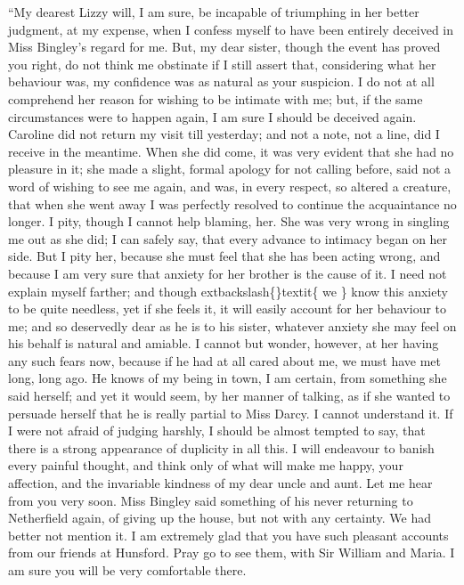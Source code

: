 \documentclass[10pt]{book}
\begin{document}
    “My dearest Lizzy will, I am sure, be incapable of triumphing in
her better judgment, at my expense, when I confess myself to have
been entirely deceived in Miss Bingley’s regard for me. But, my
dear sister, though the event has proved you right, do not think me
obstinate if I still assert that, considering what her behaviour
was, my confidence was as natural as your suspicion. I do not at
all comprehend her reason for wishing to be intimate with me; but,
if the same circumstances were to happen again, I am sure I should
be deceived again. Caroline did not return my visit till yesterday;
and not a note, not a line, did I receive in the meantime. When she
did come, it was very evident that she had no pleasure in it; she
made a slight, formal apology for not calling before, said not a
word of wishing to see me again, and was, in every respect, so
altered a creature, that when she went away I was perfectly
resolved to continue the acquaintance no longer. I pity, though I
cannot help blaming, her. She was very wrong in singling me out as
she did; I can safely say, that every advance to intimacy began on
her side. But I pity her, because she must feel that she has been
acting wrong, and because I am very sure that anxiety for her
brother is the cause of it. I need not explain myself farther; and
though
    	extbackslash\{\}textit\{
     we
    \}
    know this anxiety to be quite needless, yet if she
feels it, it will easily account for her behaviour to me; and so
deservedly dear as he is to his sister, whatever anxiety she may
feel on his behalf is natural and amiable. I cannot but wonder,
however, at her having any such fears now, because if he had at all
cared about me, we must have met long, long ago. He knows of my
being in town, I am certain, from something she said herself; and
yet it would seem, by her manner of talking,
    as if she wanted to
persuade herself that he is really partial to Miss Darcy. I cannot
understand it. If I were not afraid of judging harshly, I should be
almost tempted to say, that there is a strong appearance of
duplicity in all this. I will endeavour to banish every painful
thought, and think only of what will make me happy, your affection,
and the invariable kindness of my dear uncle and aunt. Let me hear
from you very soon. Miss Bingley said something of his never
returning to Netherfield again, of giving up the house, but not
with any certainty. We had better not mention it. I am extremely
glad that you have such pleasant accounts from our friends at
Hunsford. Pray go to see them, with Sir William and Maria. I am
sure you will be very comfortable there.
   
\end{document}
